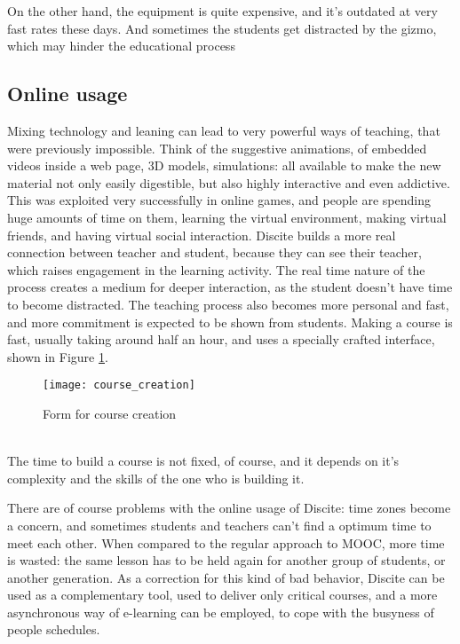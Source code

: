 On the other hand, the equipment is quite expensive, and it's outdated at very
fast rates these days. And sometimes the students get distracted by the gizmo,
which may hinder the educational process
\subsection{Online usage} Mixing technology and leaning can lead to very powerful
ways of teaching, that were previously impossible. Think of the suggestive
animations, of embedded videos inside a web page, 3D models, simulations: all
available to make the new material not only easily digestible, but also highly
interactive and even addictive. This was exploited very successfully in online
games, and people are spending huge amounts of time on them, learning the
virtual environment, making virtual friends, and having virtual social
interaction.  Discite builds a more real connection between teacher and student,
because they can see their teacher, which raises engagement in the learning
activity.  The real time nature of the process creates a medium for deeper
interaction, as the student doesn't have time to become distracted. The teaching
process also becomes more personal and fast, and more commitment is expected to
be shown from students.
Making a course is fast, usually taking around half an hour, and uses a specially
crafted interface, shown in Figure \ref{fig:course_creation}.
\begin{figure}[ht!]
\centering
\texttt{[image: course\_creation]}
\caption{Form for course creation}
\label{fig:course_creation}
\end{figure}
\\
The time to build a course is not fixed, of course, and it depends on it's complexity
and the skills of the one who is building it.

There are of course problems with the online usage of Discite: time zones become
a concern, and sometimes students and teachers can't find a optimum time to meet
each other. When compared to the regular approach to MOOC, more time is wasted:
the same lesson has to be held again for another group of students, or another
generation.  As a correction for this kind of bad behavior, Discite can be used
as a complementary tool, used to deliver only critical courses, and a more
asynchronous way of e-learning can be employed, to cope with the busyness of
people schedules.

